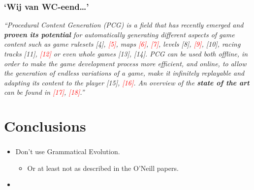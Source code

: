 \documentclass{beamer}
\makeatletter
\newcommand*{\currentname}{\@currentlabelname}
\makeatother
\begin{document}
\begin{frame}
\frametitle{`Wij van WC-eend\ldots'}
\textit{``Procedural Content Generation (PCG) is a field that has
recently emerged and \textbf{proven its potential} for automatically
generating different aspects of game content such as game
rulesets [4], \textcolor<2>{red}{[5]}, maps \textcolor<2>{red}{[6]}, \textcolor<2>{red}{[7]}, levels [8], \textcolor<2>{red}{[9]}, [10], racing
tracks [11], \textcolor<2>{red}{[12]} or even whole games [13], [14]. PCG can
be used both offline, in order to make the game development
process more efficient, and online, to allow the generation of
endless variations of a game, make it infinitely replayable and
adapting its content to the player [15], \textcolor<2>{red}{[16]}. An overview of
the \textbf{state of the art} can be found in \textcolor<2>{red}{[17]}, \textcolor<2>{red}{[18]}.''}
\end{frame}

\section{Conclusions}
\begin{frame}
\frametitle{\currentname}
\begin{itemize}
\item Don't use Grammatical Evolution.
\begin{itemize}
\item Or at least not as described in the O'Neill papers.
\end{itemize}
\item %
\end{itemize}
\end{frame}
\end{document}
